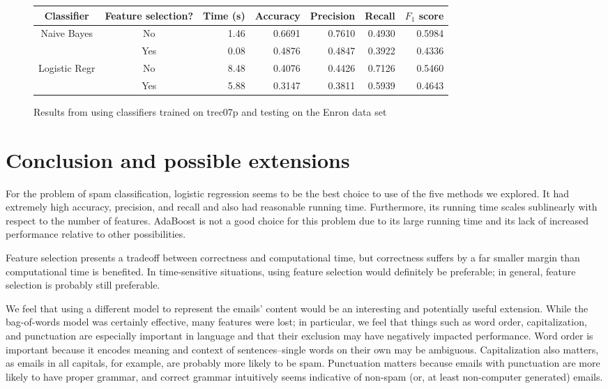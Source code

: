 \documentclass{article} %
\begin{document}
\begin{figure}[h]
  \begin{tabular}[h]{ | c | c | r | r | r | r | r | }
    \hline
    Classifier    & Feature selection? & Time (s) & Accuracy & Precision & Recall & $F_1$ score  \\ \hline
    Naive Bayes   & No                 & 1.46     & 0.6691   & 0.7610    & 0.4930 & 0.5984       \\ \cline{2-7}  
                  & Yes                & 0.08     & 0.4876   & 0.4847    & 0.3922 & 0.4336       \\ \hline
    Logistic Regr & No                 & 8.48     & 0.4076   & 0.4426    & 0.7126 & 0.5460       \\ \cline{2-7}
                  & Yes                & 5.88     & 0.3147   & 0.3811    & 0.5939 & 0.4643       \\ \hline
  \end{tabular}
  \caption{Results from using classifiers trained on trec07p and testing on the Enron data set}
  \label{fig:table_comparison}
\end{figure}

\section{Conclusion and possible extensions}

For the problem of spam classification, logistic regression seems to be the best choice to use of the five methods we explored. It had extremely high accuracy, precision, and recall and also had reasonable running time. Furthermore, its running time scales sublinearly with respect to the number of features. AdaBoost is not a good choice for this problem due to its large running time and its lack of increased performance relative to other possibilities. 

Feature selection presents a tradeoff between correctness and computational time, but correctness suffers by a far smaller margin than computational time is benefited. In time-sensitive situations, using feature selection would definitely be preferable; in general, feature selection is probably still preferable.

We feel that using a different model to represent the emails' content would be an interesting and potentially useful extension. While the bag-of-words model was certainly effective, many features were lost; in particular, we feel that things such as word order, capitalization, and punctuation are especially important in language and that their exclusion may have negatively impacted performance. Word order is important because it encodes meaning and context of sentences--single words on their own may be ambiguous. Capitalization also matters, as emails in all capitals, for example, are probably more likely to be spam. Punctuation matters because emails with punctuation are more likely to have proper grammar, and correct grammar intuitively seems indicative of non-spam (or, at least non-computer generated) emails. 
\end{document}
